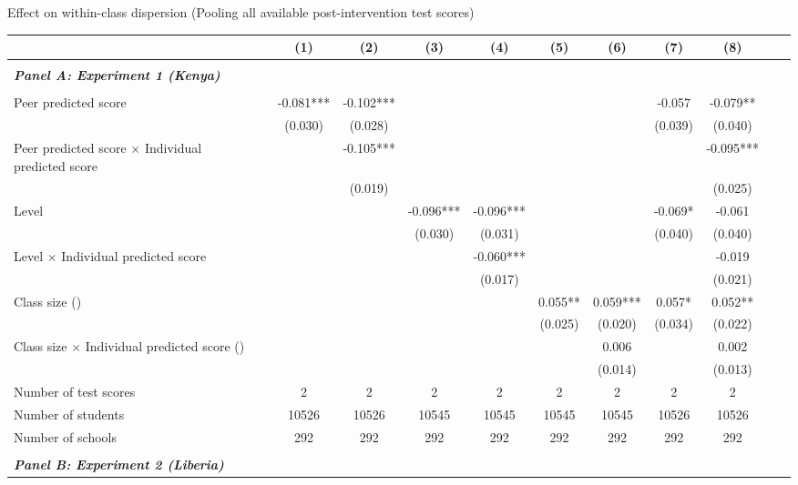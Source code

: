 \begin{center} 
\caption{\small Effect on within-class dispersion (Pooling all available post-intervention test scores)} 
\label{tab:descriptives} 
\begin{scriptsize}
\begin{threeparttable}
\begin{tabular} {@{} l l c c c c c c c c c c  @{}} \toprule \toprule
& &(1)&(2)&(3)&(4)&(5)&(6)&(7)&(8) \\ \midrule 
\\
\multicolumn{3}{l}{\textbf{\textit{Panel A: Experiment 1 (Kenya)}}} \\
\\
Peer predicted score &  & -0.081*** & -0.102*** &  &  &  &  & -0.057 & -0.079** \\
                 &  & (0.030) & (0.028) &  &  &  &  & (0.039) & (0.040) \\
Peer predicted score $\times$ Individual predicted score &  &  & -0.105*** &  &  &  &  &  & -0.095*** \\
                 &  &  & (0.019) &  &  &  &  &  & (0.025) \\
Level &  &  &  & -0.096*** & -0.096*** &  &  & -0.069* & -0.061 \\
                 &  &  &  & (0.030) & (0.031) &  &  & (0.040) & (0.040) \\
Level $\times$ Individual predicted score &  &  &  &  & -0.060*** &  &  &  & -0.019 \\
                 &  &  &  &  & (0.017) &  &  &  & (0.021) \\
Class size (\times 10) &  &  &  &  &  & 0.055** & 0.059*** & 0.057* & 0.052** \\
                 &  &  &  &  &  & (0.025) & (0.020) & (0.034) & (0.022) \\
Class size $\times$ Individual predicted score (\times 10) &  &  &  &  &  &  & 0.006 &  & 0.002 \\
                 &  &  &  &  &  &  & (0.014) &  & (0.013) \\
\midrule
Number of test scores &  & 2 & 2 & 2 & 2 & 2 & 2 & 2 & 2 \\
Number of students &  & 10526 & 10526 & 10545 & 10545 & 10545 & 10545 & 10526 & 10526 \\
Number of schools &  & 292 & 292 & 292 & 292 & 292 & 292 & 292 & 292 \\
 \midrule
\\
\multicolumn{3}{l}{\textbf{\textit{Panel B: Experiment 2 (Liberia)}}} \\

\end{tabular}
\end{threeparttable}
\end{scriptsize}
\end{center}
